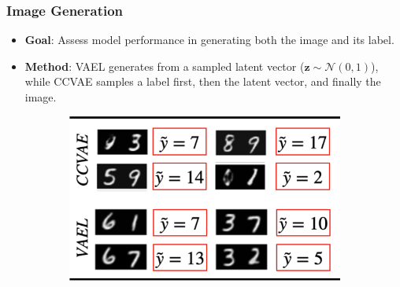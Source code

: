 \documentclass[10pt,xcolor={dvipsnames}]{beamer}
\begin{document}
\begin{frame}[t]
    \frametitle{Image Generation}
    \begin{itemize}
        \item \textbf{Goal}: Assess model performance in generating both the image and its label.
        \item \textbf{Method}: VAEL generates from a sampled latent vector ($\mathbf{z} \sim \mathcal{N}(0, 1)$), while CCVAE samples a label first, then the latent vector, and finally the image.
    \end{itemize}
    \begin{figure}[htb]
        \centering
        \begin{subfigure}[][0pt][t]{0.4\textwidth}
            \includegraphics[width=\textwidth]{figures/img-gen.png}
        \end{subfigure}
        \hspace{1cm}
        \begin{subfigure}[][0pt][t]{0.3\textwidth}

\end{subfigure}
\end{figure}
\end{frame}
\end{document}
